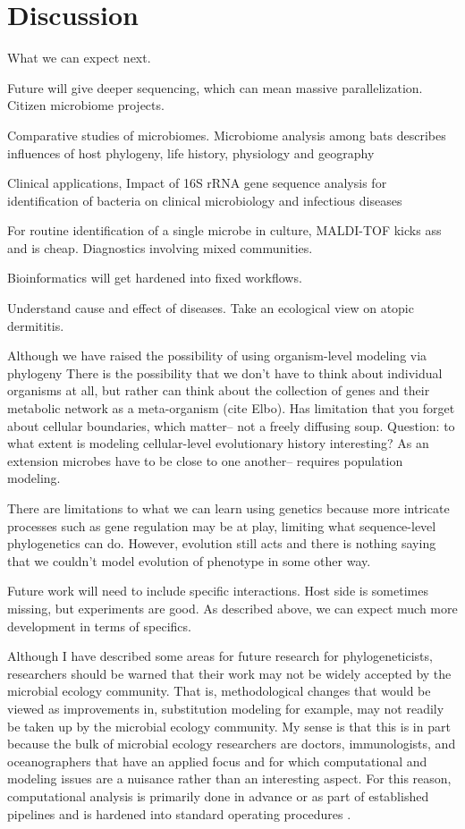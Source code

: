 \documentclass{amsart}
\begin{document}
\section{Discussion}
What we can expect next.

Future will give deeper sequencing, which can mean massive parallelization.
Citizen microbiome projects.


Comparative studies of microbiomes.
Microbiome analysis among bats describes influences of host phylogeny, life history, physiology and geography

Clinical applications,
\citep{clarridge2004}
{{I}mpact of 16{S} r{RNA} gene sequence analysis for identification of bacteria on clinical microbiology and infectious diseases}

For routine identification of a single microbe in culture, MALDI-TOF kicks ass and is cheap.
Diagnostics involving mixed communities.

Bioinformatics will get hardened into fixed workflows.

Understand cause and effect of diseases.
Take an ecological view on atopic dermititis.

Although we have raised the possibility of using organism-level modeling via phylogeny
There is the possibility that we don't have to think about individual organisms at all, but rather can think about the collection of genes and their metabolic network as a meta-organism (cite Elbo).
Has limitation that you forget about cellular boundaries, which matter-- not a freely diffusing soup.
Question: to what extent is modeling cellular-level evolutionary history interesting?
As an extension microbes have to be close to one another-- requires population modeling.

There are limitations to what we can learn using genetics because more intricate processes such as gene regulation may be at play, limiting what sequence-level phylogenetics can do.
However, evolution still acts and there is nothing saying that we couldn't model evolution of phenotype in some other way.

Future work will need to include specific interactions.
Host side is sometimes missing, but experiments are good.
As described above, we can expect much more development in terms of specifics.
\citep{hooper2012interactions}

Although I have described some areas for future research for phylogeneticists, researchers should be warned that their work may not be widely accepted by the microbial ecology community.
That is, methodological changes that would be viewed as improvements in, substitution modeling for example, may not readily be taken up by the microbial ecology community.
My sense is that this is in part because the bulk of microbial ecology researchers are doctors, immunologists, and oceanographers that have an applied focus and for which computational and modeling issues are a nuisance rather than an interesting aspect.
For this reason, computational analysis is primarily done in advance or as part of established pipelines and is hardened into standard operating procedures \citep{peplies2008standard}.
\end{document}

